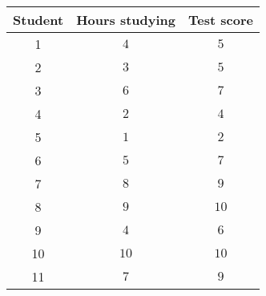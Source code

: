 \begin{tabular}{ccc}                    \toprule
Student & Hours studying & Test score \\\midrule
1       & $4$            & $5$        \\
2       & $3$            & $5$        \\
3       & $6$            & $7$        \\
4       & $2$            & $4$        \\
5       & $1$            & $2$        \\
6       & $5$            & $7$        \\
7       & $8$            & $9$        \\
8       & $9$            & $10$       \\
9       & $4$            & $6$        \\
10      & $10$           & $10$       \\
11      & $7$            & $9$        \\\bottomrule
\end{tabular}
